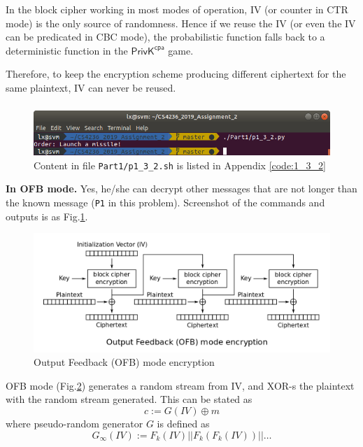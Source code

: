 In the block cipher working in most modes of operation, IV (or counter in CTR mode) is the only source of randomness.
Hence if we reuse the IV (or even the IV can be predicated in CBC mode), the probabilistic function falls back to a deterministic function in the $\mathsf{PrivK}^{\mathsf{cpa}}$ game.

Therefore, to keep the encryption scheme producing different ciphertext for the same plaintext, IV can never be reused.

\subsubsection{}

\begin{figure}[tb!]
\centering
\includegraphics[width=\columnwidth]{pictures/p1_3_2.png}
\caption{
    Content in file \texttt{Part1/p1\_3\_2.sh} is listed in Appendix \ref{code:1_3_2}
}
\label{fig:p1_3_2}
\end{figure}

\textbf{In OFB mode.}
Yes, he/she can decrypt other messages that are not longer than the known message (\texttt{P1} in this problem). Screenshot of the commands and outputs is as Fig.\ref{fig:p1_3_2}.

\begin{figure}[ht!]
\centering
\includegraphics[width=\columnwidth]{pictures/OFB_encryption.png}
\caption{
    Output Feedback (OFB) mode encryption
}
\label{fig:OFB_encryption}
\end{figure}

OFB mode (Fig.\ref{fig:OFB_encryption}) generates a random stream from IV, and XOR-s the plaintext with the random stream generated. 
This can be stated as $$ c := G(IV) \oplus m $$ where pseudo-random generator $G$ is defined as $$
G_\infty(IV) := F_k(IV) || F_k(F_k(IV)) || \ldots
$$

